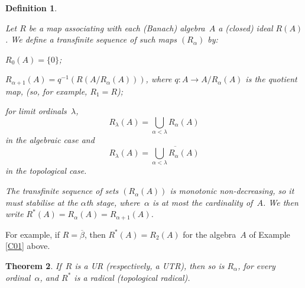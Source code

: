 \documentclass[11pt]{article}
\newcounter{rmenum}
\newenvironment{rmenumerate}{\begin{list}{(\roman{rmenum})}%
{\usecounter{rmenum}}}{\end{list}}
\newcommand{\closure}[1]{\overline{#1}}
\newcommand{\al}{\alpha}
\newcommand{\lm}{\lambda}
\newtheorem{thm}{Theorem}[section]
\newtheorem{definition}[thm]{Definition}
\newenvironment{Defn}{\begin{definition}\begin{rm}}{\end{rm}\end{definition}}
\newcommand{\Rstar}{R^*}
\begin{document}
\begin{Defn}\label{D3}
Let $R$ be a map associating with each (Banach) algebra~$A$ a (closed)
ideal $R(A)$.   We define a transfinite sequence of such maps $(R_\al)$ by:
\begin{rmenumerate}
\item $R_0(A) = \{0\}$;
\item $R_{\al+1}(A) = q^{-1}\left(R(A/R_\al(A))\right)$, where $q:A \to A/R_\al(A)$
is the quotient map,    (so, for example, $R_1 = R$);
\item for limit ordinals~$\lm$, $$R_\lm(A) = \bigcup_{\al < \lm}R_\al(A)$$ in the
algebraic case and $$R_\lm(A) = \closure{\bigcup_{\al < \lm}R_\al(A)}$$ in the
topological case.
\end{rmenumerate}
The transfinite sequence of sets $(R_\al(A))$ is monotonic non-decreasing, so it
must stabilise at the $\al$th stage, where~$\al$ is at most the cardinality
of~$A$.  We then write $\Rstar(A) = R_\al(A) = R_{\al+1}(A)$.
\end{Defn}

For example, if $R = \overline{\beta}$, then $\Rstar(A) = R_2(A)$ for the
algebra~$A$ of Example \ref{C01} above.

\begin{thm}\label{T3}
If~$R$ is a UR (respectively, a UTR), then so is $R_\al$,
for every ordinal~$\al$, and $\Rstar$ is a radical (topological radical).
\end{thm}
\end{document}
